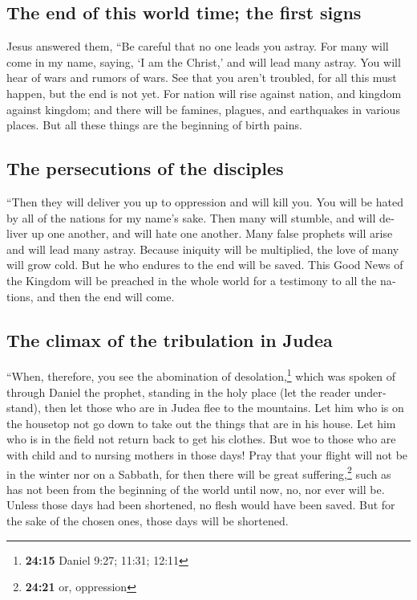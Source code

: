 \begin{paracol}{2}
\begin{otherlanguage}{english}
{\subsection{The end of this world time; the first
signs}\label{the-end-of-this-world-time-the-first-signs}}

 Jesus answered them, ``Be careful that no one leads you
astray.  For many will come in my name, saying, `I am the
Christ,' and will lead many astray.  You will hear of wars
and rumors of wars. See that you aren't troubled, for all this must
happen, but the end is not yet.  For nation will rise
against nation, and kingdom against kingdom; and there will be famines,
plagues, and earthquakes in various places.  But all these
things are the beginning of birth pains.

\hypertarget{the-persecutions-of-the-disciples}{%
\subsection{The persecutions of the
disciples}\label{the-persecutions-of-the-disciples}}

 ``Then they will deliver you up to oppression and will
kill you. You will be hated by all of the nations for my name's sake.
 Then many will stumble, and will deliver up one another,
and will hate one another.  Many false prophets will
arise and will lead many astray.  Because iniquity will
be multiplied, the love of many will grow cold.  But he
who endures to the end will be saved.  This Good News of
the Kingdom will be preached in the whole world for a testimony to all
the nations, and then the end will come.

\hypertarget{the-climax-of-the-tribulation-in-judea}{%
\subsection{The climax of the tribulation in
Judea}\label{the-climax-of-the-tribulation-in-judea}}

 ``When, therefore, you see the abomination of
desolation,\footnote{\textbf{24:15} Daniel 9:27; 11:31; 12:11} which was
spoken of through Daniel the prophet, standing in the holy place (let
the reader understand),  then let those who are in Judea
flee to the mountains.  Let him who is on the housetop
not go down to take out the things that are in his house.
 Let him who is in the field not return back to get his
clothes.  But woe to those who are with child and to
nursing mothers in those days!  Pray that your flight
will not be in the winter nor on a Sabbath,  for then
there will be great suffering,\footnote{\textbf{24:21} or, oppression}
such as has not been from the beginning of the world until now, no, nor
ever will be.  Unless those days had been shortened, no
flesh would have been saved. But for the sake of the chosen ones, those
days will be shortened.


\end{otherlanguage}
\end{paracol}
